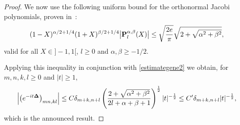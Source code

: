 \begin{proof}
We now use the following uniform bound for the orthonormal Jacobi polynomials,
proven in~\cite{erdel}:
\begin{gather}\label{erdelyi}
(1-X)^{\alpha/2+1/4}
(1+X)^{\beta/2+1/4}\big|{\bf P}_l^{\alpha,\beta}(X)\big| \leq \sqrt{\frac{2 e}{\pi}}\sqrt{2+
\sqrt{\alpha^2+\beta^2}} ,
\end{gather}
valid for all $X\in]-1,1[$, $l\geq 0 $ and
$\alpha, \beta\geq-1/2$.

Applying this inequality in conjunction with \eqref{estimategene2} we
obtain, for $m,n,k,l\geq 0$ and   $|t|\geq 1$,
\begin{gather*}%
\left|\left(e^{-it{\bf\Delta}}\right)_{mn,kl}\right|
 \leq C \delta_{m+k,n+l}
\left(\frac{2+
\sqrt{\alpha^2+\beta^2}}
{2l+\alpha +\beta +1}\right)^{\frac 12}
|t|^{-\frac 12}\leq C' \delta_{m+k,n+l} |t|^{-\frac 12} ,
\end{gather*}
which is the announced result.
\end{proof}
